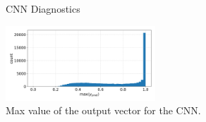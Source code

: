 \begin{figure}[h]
    \centering
    \qquad
    \caption{CNN Diagnostics\label{fig:cnn_qual}}
\end{figure}

\begin{figure}[h]
    \centering
    \includegraphics[width=0.5\textwidth]{figures/cnn_max_ypred.png}
    \caption{Max value of the output vector for the CNN.
    \label{fig:cnn_max}}
\end{figure}

